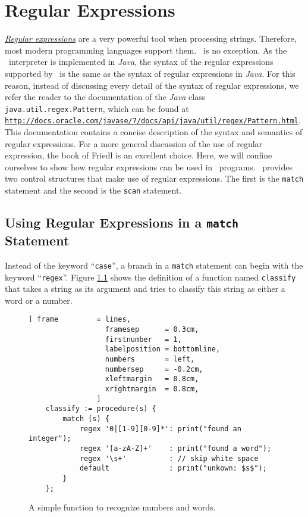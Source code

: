 \chapter{Regular Expressions \label{chapter:regular-expressions}}
\href{http://en.wikipedia.org/wiki/Regular_expression}{\emph{Regular expressions}}
are a very powerful tool when processing strings.
Therefore, most modern programming languages support them.  \setlx\ is no exception.  
As the \setlx\ interpreter is implemented in \textsl{Java}, the syntax of the regular expressions
supported by \setlx\ is the same as the syntax of regular expressions in \textsl{Java}.  For this
reason, instead of discussing every detail of the syntax of regular expressions, we refer the reader to
the documentation of the \textsl{Java} class \texttt{java.util.regex.Pattern}, which can
be found at
\\[0.2cm]
\hspace*{1.3cm}
\href{http://docs.oracle.com/javase/7/docs/api/java/util/regex/Pattern.html}{\texttt{http://docs.oracle.com/javase/7/docs/api/java/util/regex/Pattern.html}}.
\\[0.2cm]
This documentation contains a concise description of the syntax and semantics of regular expressions.
For a more general discussion of the use of regular expression, the book of Friedl
\cite{friedl:2006} is an excellent choice.
Here, we will confine ourselves to show how regular expressions can be used in
\setlx\ programs.  \setlx\ provides two control structures that make use of regular expressions.
The first is the \texttt{match} statement and the second is the \texttt{scan} statement.

\section{Using Regular Expressions in a \texttt{match} Statement}
Instead of the keyword ``\texttt{case}'', a branch in a \texttt{match} statement can begin
with the keyword ``\texttt{regex}''.  Figure \ref{fig:regexp.stlx} shows the definition of
a function named \texttt{classify} that takes a string as its argument
and tries to classify this string as either a word or a number.  


\begin{figure}[!ht]
\centering
\begin{Verbatim}[ frame         = lines, 
                  framesep      = 0.3cm, 
                  firstnumber   = 1,
                  labelposition = bottomline,
                  numbers       = left,
                  numbersep     = -0.2cm,
                  xleftmargin   = 0.8cm,
                  xrightmargin  = 0.8cm,
                ]
    classify := procedure(s) {
        match (s) {
            regex '0|[1-9][0-9]*': print("found an integer");
            regex '[a-zA-Z]+'    : print("found a word");
            regex '\s+'          : // skip white space
            default              : print("unkown: $s$");
        }
    };
\end{Verbatim}
\vspace*{-0.3cm}
\caption{A simple function to recognize numbers and words.}
\label{fig:regexp.stlx}
\end{figure}

